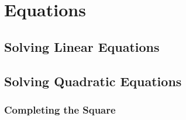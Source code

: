 \documentclass[20150903-160354-rs2.2-MarksMathNotebook.tex]{subfiles}
\begin{document}
%
%


\chapter{Equations}




\section{Solving Linear Equations}\label{Solving Linear Equations}




\section{Solving Quadratic Equations}\label{Solving Quadratic Equations}



\subsection{Completing the Square}\label{Completing the Square}
\end{document}
